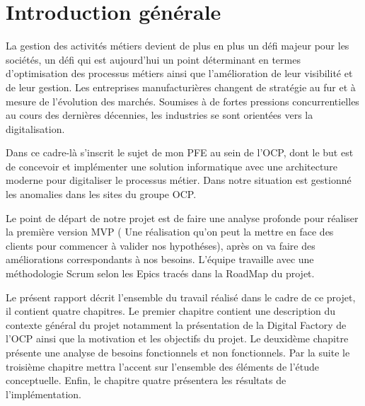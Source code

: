 \chapter{Introduction g\'en\'erale}


La gestion des activit\'es m\'etiers devient de plus en plus un d\'efi majeur pour les soci\'et\'es, un d\'efi qui est aujourd'hui un point d\'eterminant en termes d'optimisation des processus m\'etiers ainsi que l'am\'elioration de leur visibilit\'e et de leur gestion. Les entreprises manufacturi\`eres changent de strat\'egie au fur et \`a mesure de l'\'evolution des march\'es. Soumises \`a de fortes pressions concurrentielles au cours des derni\`eres d\'ecennies, les industries se sont orient\'ees vers la digitalisation.

Dans ce cadre-l\`a s'inscrit le sujet de mon \gls{PFE} au sein de l'\gls{OCP}, dont le but est de concevoir et impl\'ementer une solution informatique avec une architecture moderne pour digitaliser le processus m\'etier. Dans notre situation est gestionn\'e les anomalies dans les sites du groupe \gls{OCP}.

Le point de d\'epart de notre projet est de faire une analyse profonde pour r\'ealiser la premi\`ere version \gls{MVP} ( Une r\'ealisation qu'on peut la mettre en face des clients pour commencer \`a valider nos hypoth\'eses), apr\`es on va faire des am\'eliorations correspondants \`a nos besoins. L'\'equipe  travaille avec une m\'ethodologie Scrum selon les Epics trac\'es dans la RoadMap du projet.

Le pr\'esent rapport d\'ecrit l'ensemble du travail r\'ealis\'e dans le cadre de ce projet, il contient quatre chapitres. Le premier chapitre contient une description du contexte g\'en\'eral du projet notamment la pr\'esentation de la Digital Factory de l'\gls{OCP} ainsi que la motivation et les objectifs du projet. Le deuxid\`eme chapitre pr\'esente une analyse de besoins fonctionnels et non fonctionnels. Par la suite le troisi\`eme chapitre mettra l'accent sur l'ensemble des \'el\'ements de l'\'etude conceptuelle. Enfin, le chapitre quatre pr\'esentera les r\'esultats de l'impl\'ementation.